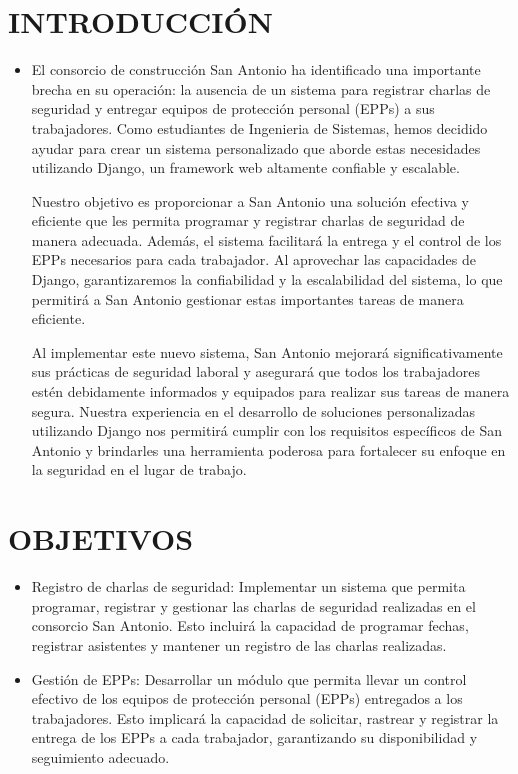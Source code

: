 \documentclass{article}
\begin{document}
\section{INTRODUCCIÓN}
\begin{itemize}
\item El consorcio de construcción San Antonio ha identificado una importante brecha en su operación: la ausencia de un sistema para registrar charlas de seguridad y entregar equipos de protección personal (EPPs) a sus trabajadores. Como estudiantes de Ingenieria de Sistemas, hemos decidido ayudar para crear un sistema personalizado que aborde estas necesidades utilizando Django, un framework web altamente confiable y escalable.

Nuestro objetivo es proporcionar a San Antonio una solución efectiva y eficiente que les permita programar y registrar charlas de seguridad de manera adecuada. Además, el sistema facilitará la entrega y el control de los EPPs necesarios para cada trabajador. Al aprovechar las capacidades de Django, garantizaremos la confiabilidad y la escalabilidad del sistema, lo que permitirá a San Antonio gestionar estas importantes tareas de manera eficiente.

Al implementar este nuevo sistema, San Antonio mejorará significativamente sus prácticas de seguridad laboral y asegurará que todos los trabajadores estén debidamente informados y equipados para realizar sus tareas de manera segura. Nuestra experiencia en el desarrollo de soluciones personalizadas utilizando Django nos permitirá cumplir con los requisitos específicos de San Antonio y brindarles una herramienta poderosa para fortalecer su enfoque en la seguridad en el lugar de trabajo.
\end{itemize}

\section{OBJETIVOS}
\begin{itemize}
\item
Registro de charlas de seguridad: Implementar un sistema que permita programar, registrar y gestionar las charlas de seguridad realizadas en el consorcio San Antonio. Esto incluirá la capacidad de programar fechas, registrar asistentes y mantener un registro de las charlas realizadas.

\item
Gestión de EPPs: Desarrollar un módulo que permita llevar un control efectivo de los equipos de protección  personal (EPPs) entregados a los trabajadores. Esto implicará la capacidad de solicitar, rastrear y registrar la entrega de los EPPs a cada trabajador, garantizando su disponibilidad y seguimiento adecuado.
\end{itemize}
\end{document}
